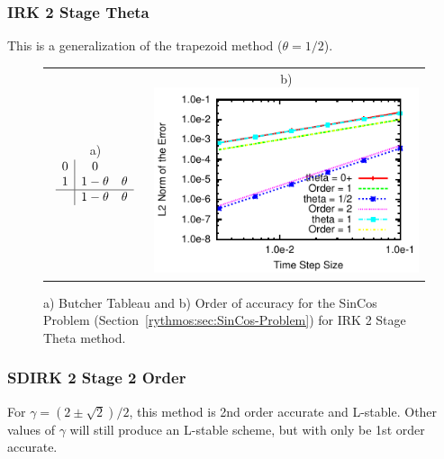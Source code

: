 \subsubsection{IRK 2 Stage Theta}

This is a generalization of the trapezoid method ($\theta=1/2$).

\begin{figure}[H]
\centering{}%
\begin{tabular}{cc}
a) $\begin{array}{c|cc}
0 & 0\\
1 & 1-\theta & \theta\\
\hline  & 1-\theta & \theta
\end{array}$ & b)\includegraphics[scale=1.5]{figures/IRK2StageTheta1}\tabularnewline
\end{tabular}\caption{a) Butcher Tableau and b) Order of accuracy for the SinCos Problem
(Section~\ref{rythmos:sec:SinCos-Problem}) for IRK 2 Stage Theta
method.}
\end{figure}



\subsubsection{SDIRK 2 Stage 2 Order}

For $\gamma=(2\pm\sqrt{2})/2$, this method is 2nd order accurate
and L-stable. Other values of $\gamma$ will still produce an L-stable
scheme, but with only be 1st order accurate.

